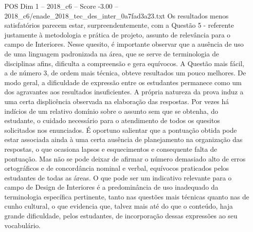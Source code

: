 \begin{textsample}{POS Dim 1 – 2018\_c6 – Score -3.00 – 2018\_c6/enade\_2018\_tec\_des\_inter\_0a7fad3a23.txt}
Os resultados menos satisfatórios parecem estar, surpreendentemente, com a Questão 5 - referente justamente à metodologia e prática de projeto, assunto de relevância para o campo de Interiores.
Nesse quesito, é importante observar que a ausência de uso de uma linguagem padronizada na área, que se serve de terminologia de disciplinas afins, dificulta a compreensão e gera equívocos.
A Questão mais fácil, a de número 3, de ordem mais técnica, obteve resultados um pouco melhores.
De modo geral, a dificuldade de expressão entre os estudantes permanece como um dos agravantes aos resultados insuficientes.
A própria natureza da prova induz a uma certa displicência observada na elaboração das respostas.
Por vezes há indícios de um relativo domínio sobre o assunto sem que se obtenha, do estudante, o cuidado necessário para o atendimento de todos os quesitos solicitados nos enunciados.
É oportuno salientar que a pontuação obtida pode estar associada ainda à uma certa ausência de planejamento na organização das respostas, o que ocasiona lapsos e esquecimentos e consequente falta de pontuação.
Mas não se pode deixar de afirmar o número demasiado alto de erros ortográficos e de concordância nominal e verbal, equívocos praticados pelos estudantes de todas as áreas.
O que pode ser um indicativo relevante para o campo de Design de Interiores é a predominância de uso inadequado da terminologia específica pertinente, tanto nas questões mais técnicas quanto nas de cunho cultural, o que evidencia que, talvez mais até do que o conteúdo, haja grande dificuldade, pelos estudantes, de incorporação dessas expressões ao seu vocabulário.

\end{textsample}
